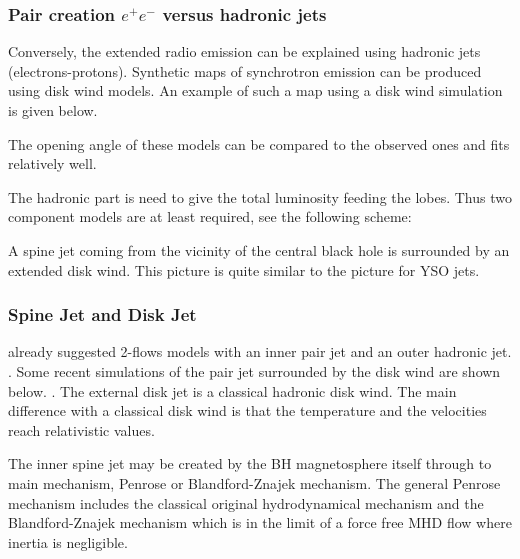 \documentclass[10pt,a4paper,english]{article}
\begin{document}
\subsubsection{\texorpdfstring{Pair creation $e^+ e^-$ versus hadronic
    jets}{Pair creation e⁺e⁻ versus hadronic jets}}
Conversely, the extended radio emission can be explained using
hadronic jets (electrons-protons). Synthetic maps of synchrotron
emission can be produced using disk wind models. An example of such a
map using a disk wind simulation is given below.  

The opening angle of these models can be compared to the observed ones
and fits relatively well. 

The hadronic part is need to give the total luminosity feeding the
lobes. Thus two component models are at least required, see the
following scheme: 

A spine jet coming from the vicinity of the central black hole is
surrounded by an extended disk wind. This picture is quite similar to
the picture for YSO jets.
\subsubsection{Spine Jet and Disk Jet}
\cite{1989MNRAS.237..411S} already suggested 2-flows models with an inner pair
jet and an outer hadronic jet. . Some recent simulations of the pair jet surrounded
by the disk wind are shown below. . The external disk jet is a classical hadronic disk wind. The
main difference with a classical disk wind is that the temperature and
the velocities reach relativistic values.

The inner spine jet may be created by the BH magnetosphere itself
through to main mechanism, Penrose or Blandford-Znajek mechanism. The
general Penrose mechanism includes the classical original
hydrodynamical mechanism and the Blandford-Znajek mechanism which is
in the limit of a force free MHD flow where inertia is negligible.
\end{document}

